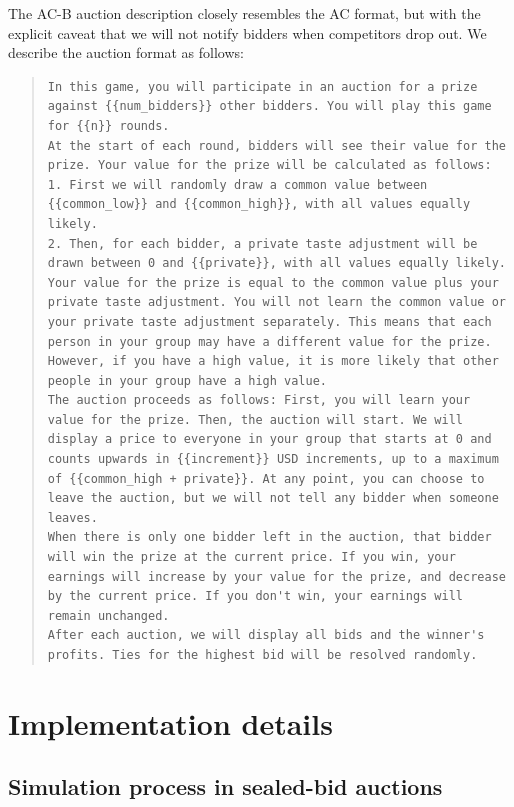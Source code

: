 \documentclass{article} %
\begin{document}
The AC-B auction description closely resembles the AC format, but with the explicit caveat that we will not notify bidders when competitors drop out. We describe the auction format as follows:\begin{quote}
\begin{lstlisting}[basicstyle=\ttfamily, breaklines=true]
In this game, you will participate in an auction for a prize against {{num_bidders}} other bidders. You will play this game for {{n}} rounds. 
At the start of each round, bidders will see their value for the prize. Your value for the prize will be calculated as follows:
1. First we will randomly draw a common value between {{common_low}} and {{common_high}}, with all values equally likely.
2. Then, for each bidder, a private taste adjustment will be drawn between 0 and {{private}}, with all values equally likely.
Your value for the prize is equal to the common value plus your private taste adjustment. You will not learn the common value or your private taste adjustment separately. This means that each person in your group may have a different value for the prize. However, if you have a high value, it is more likely that other people in your group have a high value.
The auction proceeds as follows: First, you will learn your value for the prize. Then, the auction will start. We will display a price to everyone in your group that starts at 0 and counts upwards in {{increment}} USD increments, up to a maximum of {{common_high + private}}. At any point, you can choose to leave the auction, but we will not tell any bidder when someone leaves. 
When there is only one bidder left in the auction, that bidder will win the prize at the current price. If you win, your earnings will increase by your value for the prize, and decrease by the current price. If you don't win, your earnings will remain unchanged.
After each auction, we will display all bids and the winner's profits. Ties for the highest bid will be resolved randomly.\end{lstlisting}
\end{quote}


\section{Implementation details}

\subsection{Simulation process in sealed-bid auctions}\label{app:process}
\end{document}
